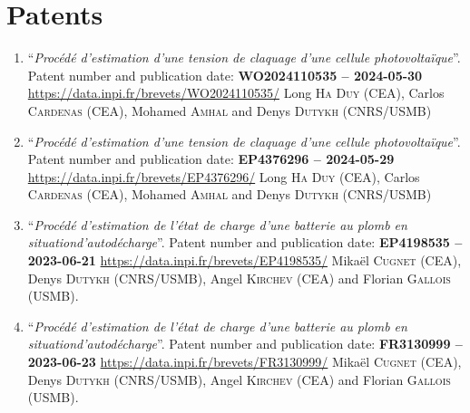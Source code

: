 \section{Patents}
\begin{enumerate}
    \item ``\textit{Proc\'ed\'e d'estimation d'une tension de claquage d'une cellule photovolta\"ique}''.\newline
        Patent number and publication date: \textbf{WO2024110535 -- 2024-05-30}\newline
        \url{https://data.inpi.fr/brevets/WO2024110535/}\newline
        Long \textsc{Ha Duy} (CEA), Carlos \textsc{Cardenas} (CEA), Mohamed \textsc{Amhal} and Denys \textsc{Dutykh} (CNRS/USMB)
    \item ``\textit{Proc\'ed\'e d'estimation d'une tension de claquage d'une cellule photovolta\"ique}''.\newline
        Patent number and publication date: \textbf{EP4376296 -- 2024-05-29}\newline
        \url{https://data.inpi.fr/brevets/EP4376296/}\newline
        Long \textsc{Ha Duy} (CEA), Carlos \textsc{Cardenas} (CEA), Mohamed \textsc{Amhal} and Denys \textsc{Dutykh} (CNRS/USMB)
    \item ``\textit{Proc\'ed\'e d'estimation de l'\'etat de charge d'une batterie au plomb en situation\newline d'autod\'echarge}''.\newline
        Patent number and publication date: \textbf{EP4198535 -- 2023-06-21}\newline
        \url{https://data.inpi.fr/brevets/EP4198535/}\newline
        Mika\"el \textsc{Cugnet} (CEA), Denys \textsc{Dutykh} (CNRS/USMB), Angel \textsc{Kirchev} (CEA) and Florian \textsc{Gallois} (USMB).
    \item ``\textit{Proc\'ed\'e d'estimation de l'\'etat de charge d'une batterie au plomb en situation\newline  d'autod\'echarge}''.\newline
        Patent number and publication date: \textbf{FR3130999 -- 2023-06-23}\newline
        \url{https://data.inpi.fr/brevets/FR3130999/}\newline
        Mika\"el \textsc{Cugnet} (CEA), Denys \textsc{Dutykh} (CNRS/USMB), Angel \textsc{Kirchev} (CEA) and Florian \textsc{Gallois} (USMB).

\end{enumerate}

